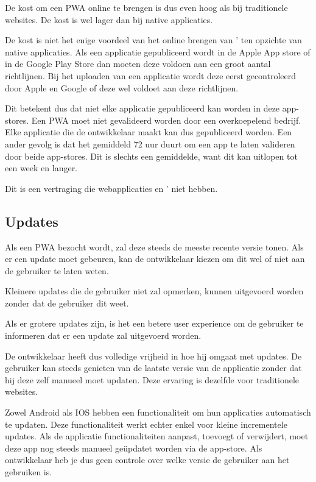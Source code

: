 	De kost om een PWA online te brengen is dus even hoog als bij traditionele websites. De kost is wel lager dan bij native applicaties. 	
	
	De kost is niet het enige voordeel van het online brengen van ' ten opzichte van native applicaties. Als een applicatie gepubliceerd wordt in de Apple App store of in de Google Play Store dan moeten deze voldoen aan een groot aantal richtlijnen. Bij het uploaden van een applicatie wordt deze eerst gecontroleerd door Apple en Google of deze wel voldoet aan deze richtlijnen. 
	\autocite{Apple2020c}
	\autocite{GooglePlay2020a}
	
	Dit betekent dus dat niet elke applicatie gepubliceerd kan worden in deze app-stores. Een PWA moet niet gevalideerd worden door een overkoepelend bedrijf. Elke applicatie die de ontwikkelaar maakt kan dus gepubliceerd worden.
	Een ander gevolg is dat het gemiddeld 72 uur duurt om een app te laten valideren door beide app-stores. Dit is slechts een gemiddelde, want dit kan uitlopen tot een week en langer.
	\autocite{Siddiqui2019}
	
	Dit is een vertraging die webapplicaties en ' niet hebben.
	
\subsection{Updates}

	Als een PWA bezocht wordt, zal deze steeds de meeste recente versie tonen. Als er een update moet gebeuren, kan de ontwikkelaar kiezen om dit wel of niet aan de gebruiker te laten weten. 	
	\autocite{Hume2018}
	
	Kleinere updates die de gebruiker niet zal opmerken, kunnen uitgevoerd worden zonder dat de gebruiker dit weet.
	 \autocite{Sanderson2020}
	 
	Als er grotere updates zijn, is het een betere user experience om de gebruiker te informeren dat er een update zal uitgevoerd worden.
	\autocite{Wicki2017}
	 
	De ontwikkelaar heeft dus volledige vrijheid in hoe hij omgaat met updates. De gebruiker kan steeds genieten van de laatste versie van de applicatie zonder dat hij deze zelf manueel moet updaten. Deze ervaring is dezelfde voor traditionele websites.
	
	Zowel Android als IOS hebben een functionaliteit om hun applicaties automatisch te updaten. Deze functionaliteit werkt echter enkel voor kleine incrementele updates. Als de applicatie functionaliteiten aanpast, toevoegt of verwijdert, moet deze app nog steeds manueel geüpdatet worden via de app-store. Als ontwikkelaar heb je dus geen controle over welke versie de gebruiker aan het gebruiken is.
	
